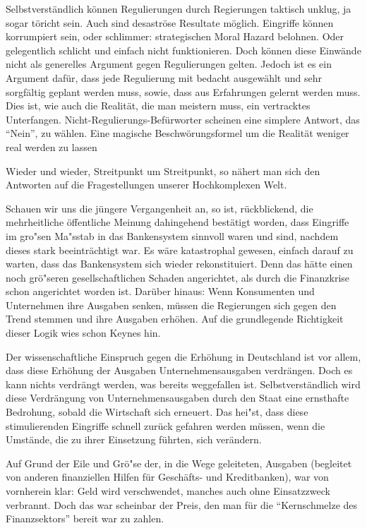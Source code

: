 \documentclass[
        onecolumn,
        a4paper,
        abstracton,
        parskip=half
        ,final
        ]{scrartcl}
\begin{document}
Selbstverst{\"a}ndlich k{\"o}nnen Regulierungen durch Regierungen taktisch unklug, ja sogar t{\"o}richt sein. Auch sind desastr{\"o}se Resultate m{\"o}glich. Eingriffe k{\"o}nnen korrumpiert sein, oder schlimmer: strategischen Moral Hazard belohnen. Oder gelegentlich schlicht und einfach nicht funktionieren. Doch k{\"o}nnen diese Einw{\"a}nde nicht als generelles Argument gegen Regulierungen gelten. Jedoch ist es ein Argument daf{\"u}r, dass jede Regulierung mit bedacht ausgew{\"a}hlt und sehr sorgf{\"a}ltig geplant werden muss, sowie, dass aus Erfahrungen gelernt werden muss. Dies ist, wie auch die Realit{\"a}t, die man meistern muss, ein vertracktes Unterfangen. Nicht-Regulierungs-Bef{\"u}rworter scheinen eine simplere Antwort, das "`Nein"', zu w{\"a}hlen. Eine magische Beschw{\"o}rungsformel um die Realit{\"a}t weniger real werden zu lassen

Wieder und wieder, Streitpunkt um Streitpunkt, so n{\"a}hert man sich den Antworten auf die Fragestellungen unserer Hochkomplexen Welt.

Schauen wir uns die j{\"u}ngere Vergangenheit an, so ist, r{\"u}ckblickend, die mehrheitliche {\"o}ffentliche Meinung dahingehend best{\"a}tigt worden, dass Eingriffe im gro{"s}en Ma{"s}stab in das Bankensystem sinnvoll waren und sind, nachdem dieses stark beeintr{\"a}chtigt war. Es w{\"a}re katastrophal gewesen, einfach darauf zu warten, dass das Bankensystem sich wieder rekonstituiert. Denn das h{\"a}tte einen noch gr{\"o}{"s}eren gesellschaftlichen Schaden angerichtet, als durch die Finanzkrise schon angerichtet worden ist. Dar{\"u}ber hinaus: Wenn Konsumenten und Unternehmen ihre Ausgaben senken, m{\"u}ssen die Regierungen sich gegen den Trend stemmen und ihre Ausgaben erh{\"o}hen. Auf die grundlegende Richtigkeit dieser Logik wies schon Keynes hin.

Der wissenschaftliche Einspruch gegen die Erh{\"o}hung in Deutschland ist vor allem, dass diese Erh{\"o}hung der Ausgaben Unternehmensausgaben verdr{\"a}ngen. Doch es kann nichts verdr{\"a}ngt werden, was bereits weggefallen ist. Selbstverst{\"a}ndlich wird diese Verdr{\"a}ngung von Unternehmensausgaben durch den Staat eine ernsthafte Bedrohung, sobald die Wirtschaft sich erneuert. Das hei{"s}t, dass diese stimulierenden Eingriffe schnell zur{\"u}ck gefahren werden m{\"u}ssen, wenn die Umst{\"a}nde, die zu ihrer Einsetzung f{\"u}hrten, sich ver{\"a}ndern.

Auf Grund der Eile und Gr{\"o}{"s}e der, in die Wege geleiteten, Ausgaben (begleitet von anderen finanziellen Hilfen f{\"u}r Gesch{\"a}fts- und Kreditbanken), war von vornherein klar: Geld wird verschwendet, manches auch ohne Einsatzzweck verbrannt. Doch das war scheinbar der Preis, den man f{\"u}r die "`Kernschmelze des Finanzsektors"' bereit war zu zahlen.
\end{document}
